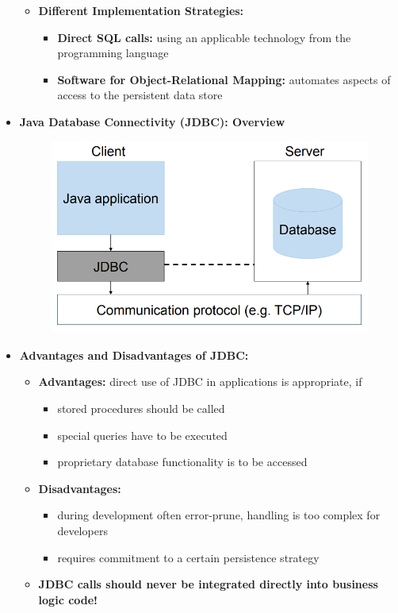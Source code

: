 \documentclass[ieeetran]{article}
\begin{document}
\begin{itemize}
\begin{itemize}
		\item \textbf{Different Implementation Strategies:}
			\begin{itemize}
			  \item \textbf{Direct SQL calls:} using an applicable technology from the programming language
			\item \textbf{Software for Object-Relational Mapping:} automates aspects of access to the persistent data store
			\end{itemize}
	\end{itemize}

	\pagebreak
\item \textbf{Java Database Connectivity (JDBC): Overview}
	\begin{figure}[h!]
	  \centering
	  \includegraphics[width=0.4\linewidth]{jdbcoverview.png}
	  \label{fig:jdbcoverview_png}
	\end{figure}

\item \textbf{Advantages and Disadvantages of JDBC:} 
				\begin{itemize}
				  \item \textbf{Advantages:} direct use of JDBC in applications is appropriate, if
					  \begin{itemize}
					    \item stored procedures should be called
						    \item special queries have to be executed
							   \item proprietary database functionality is to be accessed
					  \end{itemize}

			\item \textbf{Disadvantages:}
				\begin{itemize}
				  \item during development often error-prune, handling is too complex for developers
				\item requires commitment to a certain persistence strategy
				\end{itemize}

			\item \textbf{JDBC calls should never be integrated directly into business logic code!}
				\end{itemize}



\end{itemize}
\end{document}
